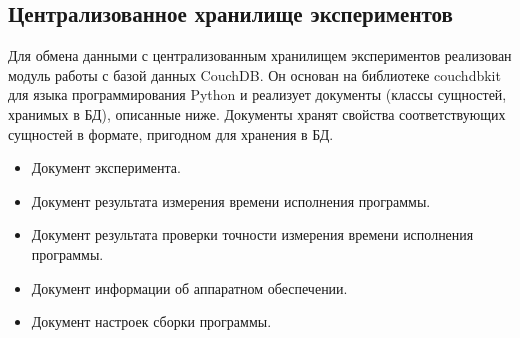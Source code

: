 \subsection{Централизованное хранилище экспериментов}

Для обмена данными с централизованным хранилищем экспериментов реализован модуль работы с базой данных CouchDB. Он основан на библиотеке couchdbkit \cite{couchdbkit} для языка программирования Python и реализует документы (классы сущностей, хранимых в БД), описанные ниже. Документы хранят свойства соответствующих сущностей в формате, пригодном для хранения в БД.

\begin{itemize}

\item Документ эксперимента.
\item Документ результата измерения времени исполнения программы.
\item Документ результата проверки точности измерения времени исполнения программы.
\item Документ информации об аппаратном обеспечении.
\item Документ настроек сборки программы.

\end{itemize}
